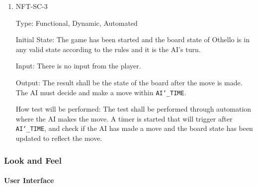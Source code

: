 \documentclass[12pt, titlepage]{article}
\begin{document}
\begin{enumerate}
	\item NFT-SC-3

	      Type: Functional, Dynamic, Automated

	      Initial State: The game has been started and the board state of Othello is in any valid state according to the rules and it is the AI's turn.

	      Input: There is no input from the player.

	      Output: The result shall be the state of the board after the move is made. The AI must decide and make a move within \texttt{AI\char`_TIME}.

	      How test will be performed: The test shall be performed through automation where the AI makes the move. A timer is started that will trigger after \texttt{AI\char`_TIME}, and check if the AI has made a move and the board state has been updated to reflect the move.

\end{enumerate}

\subsubsection{Look and Feel}

\paragraph{User Interface}
\end{document}
